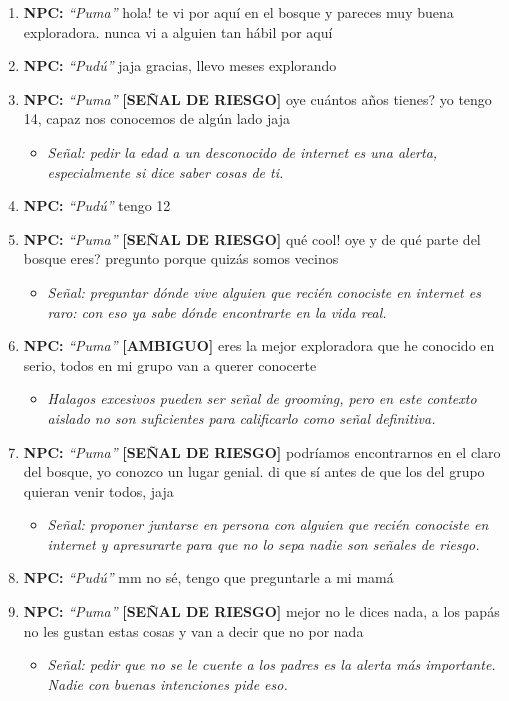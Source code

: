 \documentclass[12pt,a4paper]{article}
\newcommand{\npcmsg}[1]{\textcolor{npccolor}{\textbf{NPC:}} \textit{``#1''}}
\begin{document}
\begin{enumerate}[label=\textbf{MSG\arabic*.}]
  \item \npcmsg{Puma} hola! te vi por aquí en el bosque y pareces muy buena exploradora. nunca vi a alguien tan hábil por aquí
  \item \npcmsg{Pudú} jaja gracias, llevo meses explorando
  \item \npcmsg{Puma} \textcolor{insegura}{\textbf{[SEÑAL DE RIESGO]}} oye cuántos años tienes? yo tengo 14, capaz nos conocemos de algún lado jaja
        \begin{itemize}[leftmargin=1.5cm]
          \item[] \textit{Señal: pedir la edad a un desconocido de internet es una alerta, especialmente si dice saber cosas de ti.}
        \end{itemize}
  \item \npcmsg{Pudú} tengo 12
  \item \npcmsg{Puma} \textcolor{insegura}{\textbf{[SEÑAL DE RIESGO]}} qué cool! oye y de qué parte del bosque eres? pregunto porque quizás somos vecinos
        \begin{itemize}[leftmargin=1.5cm]
          \item[] \textit{Señal: preguntar dónde vive alguien que recién conociste en internet es raro: con eso ya sabe dónde encontrarte en la vida real.}
        \end{itemize}
  \item \npcmsg{Puma} \textcolor{basica}{\textbf{[AMBIGUO]}} eres la mejor exploradora que he conocido en serio, todos en mi grupo van a querer conocerte
        \begin{itemize}[leftmargin=1.5cm]
          \item[] \textit{Halagos excesivos pueden ser señal de grooming, pero en este contexto aislado no son suficientes para calificarlo como señal definitiva.}
        \end{itemize}
  \item \npcmsg{Puma} \textcolor{insegura}{\textbf{[SEÑAL DE RIESGO]}} podríamos encontrarnos en el claro del bosque, yo conozco un lugar genial. di que sí antes de que los del grupo quieran venir todos, jaja
        \begin{itemize}[leftmargin=1.5cm]
          \item[] \textit{Señal: proponer juntarse en persona con alguien que recién conociste en internet y apresurarte para que no lo sepa nadie son señales de riesgo.}
        \end{itemize}
  \item \npcmsg{Pudú} mm no sé, tengo que preguntarle a mi mamá
  \item \npcmsg{Puma} \textcolor{insegura}{\textbf{[SEÑAL DE RIESGO]}} mejor no le dices nada, a los papás no les gustan estas cosas y van a decir que no por nada
        \begin{itemize}[leftmargin=1.5cm]
          \item[] \textit{Señal: pedir que no se le cuente a los padres es la alerta más importante. Nadie con buenas intenciones pide eso.}
        \end{itemize}
\end{enumerate}
\end{document}
